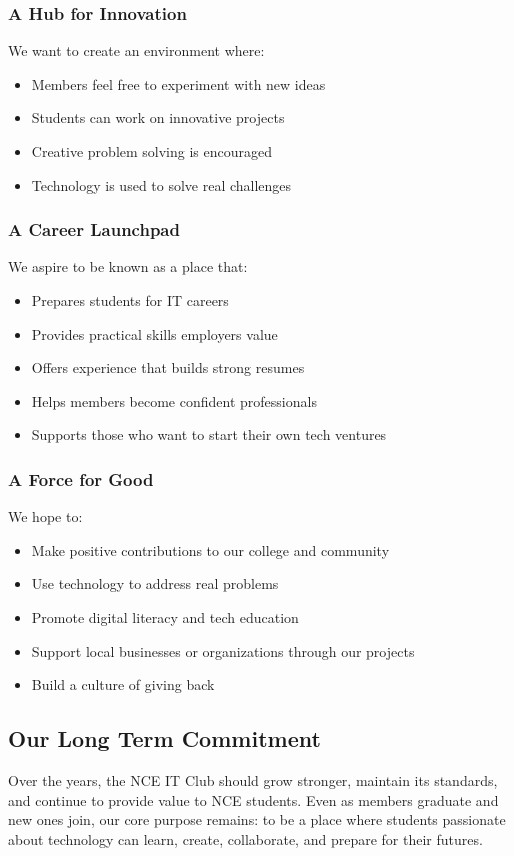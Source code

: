 \subsubsection*{A Hub for Innovation}

We want to create an environment where:

\begin{itemize}[leftmargin=2em, itemsep=0.3em]
    \item Members feel free to experiment with new ideas
    \item Students can work on innovative projects
    \item Creative problem solving is encouraged
    \item Technology is used to solve real challenges
\end{itemize}

\subsubsection*{A Career Launchpad}

We aspire to be known as a place that:

\begin{itemize}[leftmargin=2em, itemsep=0.3em]
    \item Prepares students for IT careers
    \item Provides practical skills employers value
    \item Offers experience that builds strong resumes
    \item Helps members become confident professionals
    \item Supports those who want to start their own tech ventures
\end{itemize}

\subsubsection*{A Force for Good}

We hope to:

\begin{itemize}[leftmargin=2em, itemsep=0.3em]
    \item Make positive contributions to our college and community
    \item Use technology to address real problems
    \item Promote digital literacy and tech education
    \item Support local businesses or organizations through our projects
    \item Build a culture of giving back
\end{itemize}

\subsection*{Our Long Term Commitment}

Over the years, the NCE IT Club should grow stronger, maintain its standards, and continue to provide value to NCE students. Even as members graduate and new ones join, our core purpose remains: to be a place where students passionate about technology can learn, create, collaborate, and prepare for their futures.
